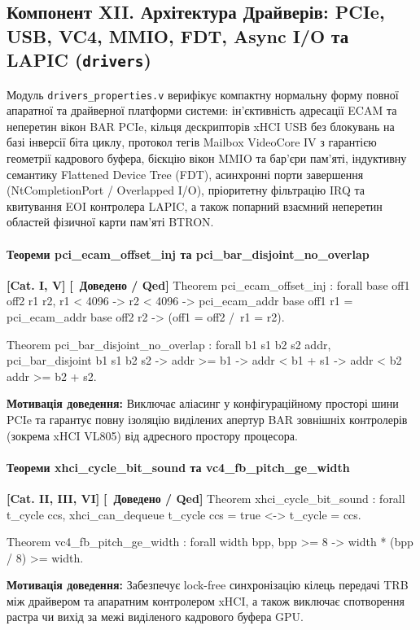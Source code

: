 \documentclass{article}
\let\originalfootnotesize\footnotesize
\let\oldverbatim\verbatim
\let\oldendverbatim\endverbatim
\renewenvironment{verbatim}{\originalfootnotesize\oldverbatim}{\oldendverbatim}
\newcommand{\thmcategory}[1]{{\small\textbf{\color{coreblue}[#1]}}}
\newcommand{\thmproven}{{\small\textbf{\color{productgreen}[\checkmark\ Доведено / Qed]}}}
\newcommand{\thmmotivation}[1]{%
  \par\smallskip\noindent\colorbox{boxbg}{\parbox{\dimexpr\linewidth-2\fboxsep\relax}{%
    \small\textbf{Мотивація доведення:} #1%
  }}\par\medskip
}
\begin{document}
\subsection[Компонент XII. Архітектура Драйверів]{Компонент XII. Архітектура Драйверів: PCIe, USB, VC4, MMIO, FDT, Async I/O та LAPIC (\texttt{drivers})}

Модуль \texttt{drivers\_properties.v} верифікує компактну нормальну форму повної апаратної та драйверної платформи системи: ін'єктивність адресації ECAM та неперетин вікон BAR PCIe, кільця дескрипторів xHCI USB без блокувань на базі інверсії біта циклу, протокол тегів Mailbox VideoCore IV з гарантією геометрії кадрового буфера, бієкцію вікон MMIO та бар'єри пам'яті, індуктивну семантику Flattened Device Tree (FDT), асинхронні порти завершення (NtCompletionPort / Overlapped I/O), пріоритетну фільтрацію IRQ та квитування EOI контролера LAPIC, а також попарний взаємний неперетин областей фізичної карти пам'яті BTRON.

\paragraph{Теореми pci\_ecam\_offset\_inj та pci\_bar\_disjoint\_no\_overlap} \thmcategory{Cat. I, V} \thmproven
\begin{verbatim}
Theorem pci_ecam_offset_inj : forall base off1 off2 r1 r2,
  r1 < 4096 -> r2 < 4096 ->
  pci_ecam_addr base off1 r1 = pci_ecam_addr base off2 r2 ->
  (off1 = off2 /\ r1 = r2).

Theorem pci_bar_disjoint_no_overlap : forall b1 s1 b2 s2 addr,
  pci_bar_disjoint b1 s1 b2 s2 ->
  addr >= b1 -> addr < b1 + s1 ->
  addr < b2 \/ addr >= b2 + s2.
\end{verbatim}
\thmmotivation{Виключає аліасинг у конфігураційному просторі шини PCIe та гарантує повну ізоляцію виділених апертур BAR зовнішніх контролерів (зокрема xHCI VL805) від адресного простору процесора.}

\paragraph{Теореми xhci\_cycle\_bit\_sound та vc4\_fb\_pitch\_ge\_width} \thmcategory{Cat. II, III, VI} \thmproven
\begin{verbatim}
Theorem xhci_cycle_bit_sound : forall t_cycle ccs,
  xhci_can_dequeue t_cycle ccs = true <-> t_cycle = ccs.

Theorem vc4_fb_pitch_ge_width : forall width bpp,
  bpp >= 8 -> width * (bpp / 8) >= width.
\end{verbatim}
\thmmotivation{Забезпечує lock-free синхронізацію кілець передачі TRB між драйвером та апаратним контролером xHCI, а також виключає спотворення растра чи вихід за межі виділеного кадрового буфера GPU.}
\end{document}
